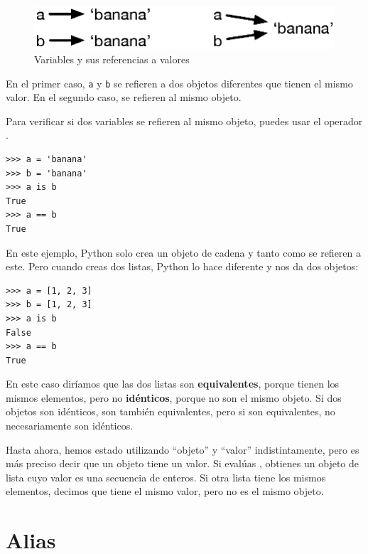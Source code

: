 \begin{figure}
\centerline
{\includegraphics[scale=0.8]{images/list1.eps}}
\caption{Variables y sus referencias a valores}
\label{fig.list1}
\end{figure}

En el primer caso, \texttt{a} y \texttt{b} se refieren a dos objetos diferentes que
tienen el mismo valor.  En el segundo caso, se refieren al mismo
objeto.

Para verificar si dos variables se refieren al mismo objeto, puedes
usar el operador .

\begin{Verbatim}[frame=single]
>>> a = 'banana'
>>> b = 'banana'
>>> a is b
True
>>> a == b
True
\end{Verbatim}
%
En este ejemplo, Python solo crea un objeto de cadena y tanto  como  se refieren a este.  Pero cuando creas dos listas, Python lo hace diferente y nos da
dos objetos:

\begin{Verbatim}[frame=single]
>>> a = [1, 2, 3]
>>> b = [1, 2, 3]
>>> a is b
False
>>> a == b 
True
\end{Verbatim}
%


En este caso diríamos que las dos listas son \textbf{equivalentes},
porque tienen los mismos elementos, pero no \textbf{idénticos}, porque
no son el mismo objeto.  Si dos objetos son idénticos, son
también equivalentes, pero si son equivalentes, no necesariamente son
idénticos.

Hasta ahora, hemos estado utilizando ``objeto'' y ``valor''
indistintamente, pero es más preciso decir que un objeto tiene un
valor.  Si evalúas \pythoninline{[1, 2, 3]}, obtienes un objeto de
lista cuyo valor es una secuencia de enteros.  Si otra
lista tiene los mismos elementos, decimos que tiene el mismo valor, pero
no es el mismo objeto.


\section{Alias}

